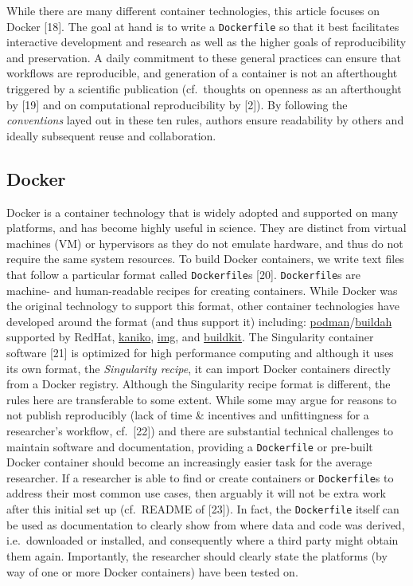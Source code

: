 \documentclass[10pt,letterpaper]{article}
\begin{document}
While there are many different container technologies, this article
focuses on Docker {[}18{]}. The goal at hand is to write a
\texttt{Dockerfile} so that it best facilitates interactive development
and research as well as the higher goals of reproducibility and
preservation. A daily commitment to these general practices can ensure
that workflows are reproducible, and generation of a container is not an
afterthought triggered by a scientific publication (cf.~thoughts on
openness as an afterthought by {[}19{]} and on computational
reproducibility by {[}2{]}). By following the \emph{conventions} layed
out in these ten rules, authors ensure readability by others and ideally
subsequent reuse and collaboration.

\hypertarget{docker}{%
\subsection*{Docker}\label{docker}}

Docker is a container technology that is widely adopted and supported on
many platforms, and has become highly useful in science. They are
distinct from virtual machines (VM) or hypervisors as they do not
emulate hardware, and thus do not require the same system resources. To
build Docker containers, we write text files that follow a particular
format called \texttt{Dockerfile}s {[}20{]}. \texttt{Dockerfile}s are
machine- and human-readable recipes for creating containers. While
Docker was the original technology to support this format, other
container technologies have developed around the format (and thus
support it) including:
\href{https://podman.io/}{podman}/\href{https://github.com/containers/buildah}{buildah}
supported by RedHat,
\href{https://github.com/GoogleContainerTools/kaniko}{kaniko},
\href{https://github.com/genuinetools/img}{img}, and
\href{https://github.com/moby/buildkit}{buildkit}. The Singularity
container software {[}21{]} is optimized for high performance computing
and although it uses its own format, the \emph{Singularity recipe}, it
can import Docker containers directly from a Docker registry. Although
the Singularity recipe format is different, the rules here are
transferable to some extent. While some may argue for reasons to not
publish reproducibly (lack of time \& incentives and unfittingness for a
researcher's workflow, cf.~{[}22{]}) and there are substantial technical
challenges to maintain software and documentation, providing a
\texttt{Dockerfile} or pre-built Docker container should become an
increasingly easier task for the average researcher. If a researcher is
able to find or create containers or \texttt{Dockerfile}s to address
their most common use cases, then arguably it will not be extra work
after this initial set up (cf.~README of {[}23{]}). In fact, the
\texttt{Dockerfile} itself can be used as documentation to clearly show
from where data and code was derived, i.e.~downloaded or installed, and
consequently where a third party might obtain them again. Importantly,
the researcher should clearly state the platforms (by way of one or more
Docker containers) have been tested on.
\end{document}
